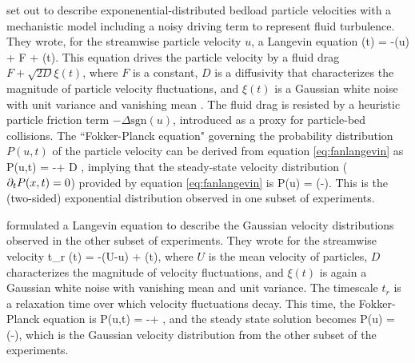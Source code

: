\citet{Fan2014} set out to describe exponenential-distributed bedload particle velocities with a mechanistic model including a noisy driving term to represent fluid turbulence.
They wrote, for the streamwise particle velocity $u$, a Langevin equation
\be {}(t) = -\Delta {}(u) + F + \xi(t). \label{eq:fanlangevin}\ee
This equation drives the particle velocity by a fluid drag $F + \sqrt{2D} \xi(t)$, where $F$ is a constant, $D$ is a diffusivity that characterizes the magnitude of particle velocity fluctuations, and $\xi(t)$ is a Gaussian white noise with unit variance and vanishing mean \citep{Gardiner1983}. The fluid drag is resisted by a heuristic particle friction term $-\Delta \text{sgn}(u)$, introduced as a proxy for particle-bed collisions. The ``Fokker-Planck equation" governing the probability distribution $P(u,t)$ of the particle velocity can be derived from equation \ref{eq:fanlangevin} as \citep{Risken1984,VanKampen2007} 
\be {} P(u,t) = -\Delta{} + D ,\ee
implying that the steady-state velocity distribution ($\partial_t P(x,t) = 0$) provided by equation \ref{eq:fanlangevin} is
\be P(u) = \exp\Big(-\Big).\ee
This is the (two-sided) exponential distribution observed in one subset of experiments.

\citet{Ancey2014} formulated a Langevin equation to describe the Gaussian velocity distributions observed in the other subset of experiments. They wrote for the streamwise velocity 
\be t_r (t) = -(U-u) + \xi(t),\ee
where $U$ is the mean velocity of particles, $D$ characterizes the magnitude of velocity fluctuations, and $\xi(t)$ is again a Gaussian white noise with vanishing mean and unit variance. The timescale $t_r$ is a relaxation time over which velocity fluctuations decay. This time, the Fokker-Planck equation is
\be {} P(u,t) = - + ,\ee 
and the steady state solution becomes
\be P(u) =  \exp\Big(-\Big), \ee
which is the Gaussian velocity distribution from the other subset of the experiments.

